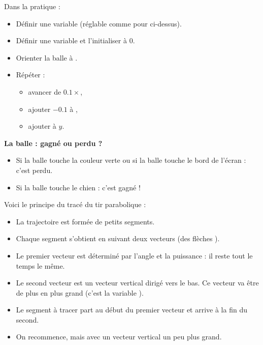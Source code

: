 \documentclass[class=report,crop=false, 12pt]{standalone}
\begin{document}
\begin{activite}
Dans la pratique :
\begin{itemize}
  \item Définir une variable  (réglable comme pour  ci-dessus).

  \item Définir une variable  et l'initialiser à $0$.
  
  \item Orienter la balle à .
  
  \item Répéter :
  \begin{itemize}
    \item avancer de $0.1 \times$,
    
    \item ajouter $-0.1$ à ,
    
    \item ajouter  à $y$.
    
  \end{itemize}
\end{itemize}


\bigskip
\textbf{La balle : gagné ou perdu ?}

\begin{itemize}
  \item Si la balle touche la couleur verte ou si la balle touche le bord de l'écran : c'est perdu.
  \item Si la balle touche le chien : c'est gagné !
\end{itemize}


\bigskip

Voici le principe du tracé du tir parabolique : 
\begin{itemize}
  \item La trajectoire est formée de petits segments.
  \item Chaque segment s'obtient en suivant deux vecteurs (des \og flèches \fg{}).
  \item Le premier vecteur est déterminé par l'angle et la puissance : il reste tout le temps le même.
  \item Le second vecteur est un vecteur vertical dirigé vers le bas. Ce vecteur va être de plus en plus grand (c'est la variable ).
  \item Le segment à tracer part au début du premier vecteur et arrive à la fin du second.
  \item On recommence, mais avec un vecteur vertical un peu plus grand.
\end{itemize}  


\bigskip


\end{activite}
\end{document}
